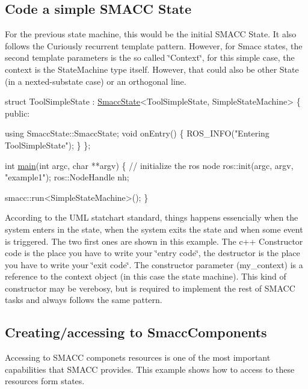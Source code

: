 \subsection*{Code a simple S\+M\+A\+CC State}

For the previous state machine, this would be the initial S\+M\+A\+CC State. It also follows the Curiously recurrent template pattern. However, for Smacc states, the second template parameters is the so called \char`\"{}\+Context\char`\"{}, for this simple case, the context is the State\+Machine type itself. However, that could also be other State (in a nexted-\/substate case) or an orthogonal line.


\begin{DoxyCode}
\textcolor{keyword}{struct }ToolSimpleState
    : \hyperlink{classSmaccState}{SmaccState}<ToolSimpleState, SimpleStateMachine>
\{
\textcolor{keyword}{public}:

  \textcolor{keyword}{using} SmaccState::SmaccState;
  \textcolor{keywordtype}{void} onEntry()
  \{
    ROS\_INFO(\textcolor{stringliteral}{"Entering ToolSimpleState"});
  \}
\};

\textcolor{keywordtype}{int} \hyperlink{odom__tracker__node_8cpp_a3c04138a5bfe5d72780bb7e82a18e627}{main}(\textcolor{keywordtype}{int} argc, \textcolor{keywordtype}{char} **argv) \{
  \textcolor{comment}{// initialize the ros node}
  ros::init(argc, argv, \textcolor{stringliteral}{"example1"});
  ros::NodeHandle nh;

  smacc::run<SimpleStateMachine>();
\}
\end{DoxyCode}
 According to the U\+ML statchart standard, things happens essencially when the system enters in the state, when the system exits the state and when some event is triggered. The two first ones are shown in this example. The c++ Constructor code is the place you have to write your \char`\"{}entry code\char`\"{}, the destructor is the place you have to write your \char`\"{}exit code\char`\"{}. The constructor parameter (my\+\_\+context) is a reference to the context object (in this case the state machine). This kind of constructor may be verebosy, but is required to implement the rest of S\+M\+A\+CC tasks and always follows the same pattern.

\subsection*{Creating/accessing to Smacc\+Components}

Accessing to S\+M\+A\+CC componets resources is one of the most important capabilities that S\+M\+A\+CC provides. This example shows how to access to these resources form states.


